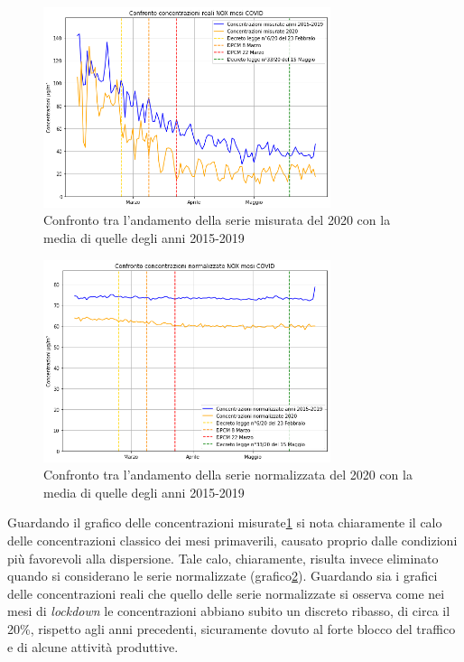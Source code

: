 \documentclass[a4paper]{report}
\begin{document}
\begin{figure}[h]
\centering
\includegraphics[width=0.75\textwidth]{nox_covid}
\caption{Confronto tra l'andamento della serie misurata del 2020 con la media di quelle degli anni 2015-2019}
\label{fig:nox_covid}
\end{figure}

\begin{figure}[h]
\centering
\includegraphics[width=0.75\textwidth]{nox_covid_norm}
\caption{Confronto tra l'andamento della serie normalizzata del 2020 con la media di quelle degli anni 2015-2019}
\label{fig:nox_covid_norm}
\end{figure}

Guardando il grafico delle concentrazioni misurate\ref{fig:nox_covid} si nota chiaramente il calo delle concentrazioni classico dei mesi primaverili, causato proprio dalle condizioni più favorevoli alla dispersione. Tale calo, chiaramente, risulta invece eliminato quando si considerano le serie normalizzate (grafico\ref{fig:nox_covid_norm}).
Guardando sia i grafici delle concentrazioni reali che quello delle serie normalizzate si osserva come nei mesi di \textit{lockdown} le concentrazioni abbiano subito un discreto ribasso, di circa il 20\%, rispetto agli anni precedenti, sicuramente dovuto al forte blocco del traffico e di alcune attività produttive.
\end{document}
